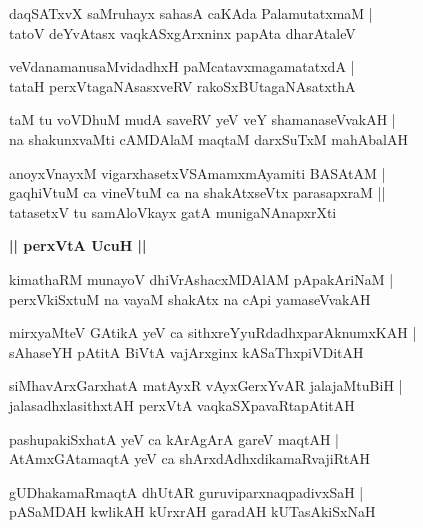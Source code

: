 \documentclass[twoside,12pt,openright]{book}
\newcounter{shloka}[chapter]
\def\uvaca#1{\centerline{{\large\textbf{#1}}}}
\begin{document}
\begin{shloka}%
daqSATxvX saMruhayx sahasA caKAda PalamutatxmaM |\\
tatoV deYvAtasx vaqkASxgArxninx papAta dharAtaleV 
\end{shloka}

\begin{shloka}%
veVdanamanusaMvidadhxH paMcatavxmagamatatxdA |\\
tataH perxVtagaNAsasxveRV rakoSxBUtagaNAsatxthA 
\end{shloka}

\begin{shloka}%
taM tu voVDhuM mudA saveRV yeV veY shamanaseVvakAH |\\
na shakunxvaMti cAMDAlaM maqtaM darxSuTxM mahAbalAH 
\end{shloka}

\begin{shloka}%
anoyxVnayxM vigarxhasetxVSAmamxmAyamiti BASAtAM |\\
gaqhiVtuM ca vineVtuM ca na shakAtxseVtx parasapxraM ||\\
tatasetxV tu samAloVkayx gatA munigaNAnapxrXti 
\end{shloka}

\uvaca{|| perxVtA UcuH ||}

\begin{shloka}%
kimathaRM munayoV dhiVrAshacxMDAlAM pApakAriNaM |\\
perxVkiSxtuM na vayaM shakAtx na cApi yamaseVvakAH 
\end{shloka}

\begin{shloka}%
mirxyaMteV GAtikA yeV ca sithxreYyuRdadhxparAknumxKAH |\\
sAhaseYH pAtitA BiVtA vajArxginx kASaThxpiVDitAH
\end{shloka}

\begin{shloka}%
siMhavArxGarxhatA matAyxR vAyxGerxYvAR jalajaMtuBiH |\\
jalasadhxlasithxtAH perxVtA vaqkaSXpavaRtapAtitAH 
\end{shloka}

\begin{shloka}%
pashupakiSxhatA yeV ca kArAgArA gareV maqtAH |\\
AtAmxGAtamaqtA yeV ca shArxdAdhxdikamaRvajiRtAH 
\end{shloka}

\begin{shloka}%
gUDhakamaRmaqtA dhUtAR guruviparxnaqpadivxSaH |\\
pASaMDAH kwlikAH kUrxrAH garadAH kUTasAkiSxNaH
\end{shloka}
\end{document}
